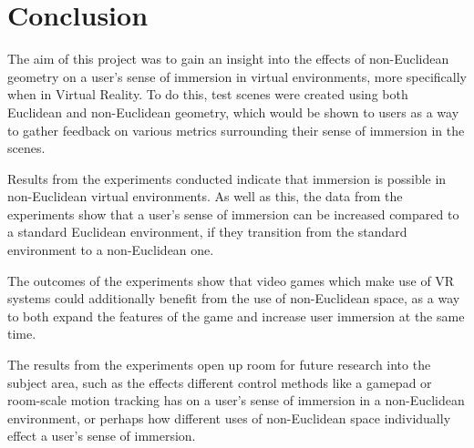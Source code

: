 \chapter{Conclusion}
\label{conclusion}

	The aim of this project was to gain an insight into the effects of non-Euclidean geometry on a user's sense of immersion in virtual environments, more specifically when in Virtual Reality.
	To do this, test scenes were created using both Euclidean and non-Euclidean geometry, which would be shown to users as a way to gather feedback on various metrics surrounding their sense of immersion in the scenes.

	Results from the experiments conducted indicate that immersion is possible in non-Euclidean virtual environments.
	As well as this, the data from the experiments show that a user's sense of immersion can be increased compared to a standard Euclidean environment, if they transition from the standard environment to a non-Euclidean one.

	The outcomes of the experiments show that video games which make use of VR systems could additionally benefit from the use of non-Euclidean space, as a way to both expand the features of the game and increase user immersion at the same time.

	The results from the experiments open up room for future research into the subject area, such as the effects different control methods like a gamepad or room-scale motion tracking has on a user's sense of immersion in a non-Euclidean environment, or perhaps how different uses of non-Euclidean space individually effect a user's sense of immersion.
